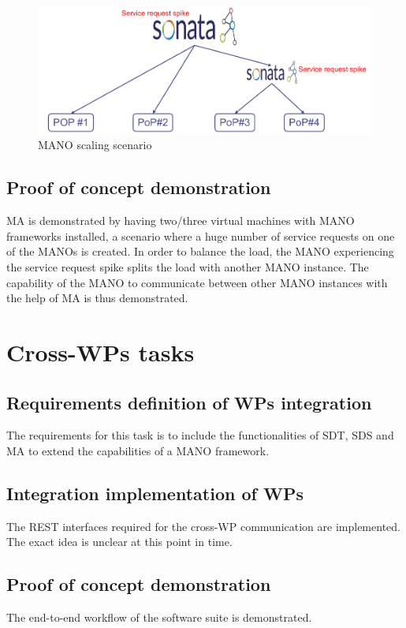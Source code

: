 \begin{figure}[h]
	\centering
	\includegraphics[width=0.9\linewidth]{figures/wp3manoScale}
	\caption{MANO scaling scenario \cite{WPDescriptionsPDF}}
	\label{fig:wp3manoscale}
\end{figure}


\subsection{Proof of concept demonstration}
MA is demonstrated by having two/three virtual machines with MANO frameworks installed, a scenario where a huge number of service requests on one of the MANOs is created. In order to balance the load, the MANO experiencing the service request spike splits the load with another MANO instance. The capability of the MANO to communicate between other MANO instances with the help of MA is thus demonstrated.

\section{Cross-WPs tasks}
\subsection{Requirements definition of WPs integration}
The requirements for this task is to include the functionalities of SDT, SDS and MA to extend the capabilities of a MANO framework.

\subsection{Integration implementation of WPs}
The REST interfaces required for the cross-WP communication are implemented.
The exact idea is unclear at this point in time. 


\subsection{Proof of concept demonstration}
The end-to-end workflow of the software suite is demonstrated. 

